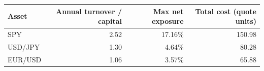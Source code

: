 \begin{tabular}{lrrr}
\toprule
Asset & Annual turnover / capital & Max net exposure & Total cost (quote units) \\
\midrule
SPY & 2.52 & 17.16\% & 150.98 \\
USD/JPY & 1.30 & 4.64\% & 80.28 \\
EUR/USD & 1.06 & 3.57\% & 65.88 \\
\bottomrule
\end{tabular}
